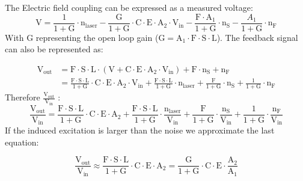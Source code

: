 The  Electric field coupling can be expressed as a measured voltage:
$$\mathrm{V} = \frac{1}{1 + \mathrm{G}} \cdot \mathrm{n}_\mathrm{laser} - \frac{\mathrm{G}}{1 + \mathrm{G}} \cdot \mathrm{C}  \cdot \mathrm{E} \cdot \mathrm{A}_{2} \cdot \mathrm{V}_\mathrm{in} - \frac{\mathrm{F} \cdot \mathrm{A}_1}{1 + \mathrm{G}} \cdot \mathrm{n}_\mathrm{S} - \frac{A_1}{1 + \mathrm{G}} \cdot \mathrm{n}_\mathrm{F}$$
With G representing the open loop gain ($\mathrm{G} = \mathrm{A}_1 \cdot \mathrm{F} \cdot \mathrm{S} \cdot \mathrm{L}$). The feedback signal can also be represented as:

	\begin{align*} \mathrm{V}_\mathrm{out} & = \mathrm{F} \cdot \mathrm{S} \cdot \mathrm{L} \cdot (\mathrm{V} + \mathrm{C} \cdot \mathrm{E} \cdot \mathrm{A}_{2} \cdot \mathrm{V}_\mathrm{in}) + \mathrm{F} \cdot \mathrm{n}_\mathrm{S} + \mathrm{n}_\mathrm{F} \\ & = \frac{\mathrm{F} \cdot \mathrm{S} \cdot \mathrm{L}}{ 1 + \mathrm{G}} \cdot \mathrm{C} \cdot \mathrm{E} \cdot \mathrm{A}_{2} \cdot \mathrm{V}_\mathrm{in} + \frac{\mathrm{F} \cdot \mathrm{S} \cdot \mathrm{L}}{ 1 + \mathrm{G}} \cdot \mathrm{n}_\mathrm{laser} + \frac{\mathrm{F} }{ 1 + \mathrm{G}}\cdot \mathrm{n}_\mathrm{S} +  \frac{1}{ 1 + \mathrm{G}} \cdot \mathrm{n}_\mathrm{F} \end{align*}
Therefore $\frac{\mathrm{V}_\mathrm{out}}{\mathrm{V}_\mathrm{in}}$ : 
$$ \frac{\mathrm{V}_\mathrm{out}}{\mathrm{V}_\mathrm{in}} = \frac{\mathrm{F} \cdot \mathrm{S} \cdot \mathrm{L}}{1 + \mathrm{G}} \cdot \mathrm{C} \cdot \mathrm{E} \cdot \mathrm{A}_{2}  + \frac{\mathrm{F} \cdot \mathrm{S} \cdot \mathrm{L}}{ 1 + \mathrm{G}} \cdot \frac{\mathrm{n}_\mathrm{laser}}{\mathrm{V}_\mathrm{in}}+ \frac{\mathrm{F} }{ 1 + \mathrm{G}} \cdot \frac{\mathrm{n}_\mathrm{S}}{\mathrm{V}_\mathrm{in}} +  \frac{1}{ 1 + \mathrm{G}} \cdot \frac{\mathrm{n}_\mathrm{F}}{\mathrm{V}_\mathrm{in}}$$
If the induced excitation is larger than the noise  we approximate the last equation:

$$ \frac{\mathrm{V}_\mathrm{out}}{\mathrm{V_{in}}} \approx \frac{\mathrm{F} \cdot \mathrm{S} \cdot \mathrm{L}}{1 + \mathrm{G}} \cdot \mathrm{C} \cdot \mathrm{E} \cdot \mathrm{A}_{2} = \frac{\mathrm{G}}{1 + \mathrm{G}} \cdot \mathrm{C} \cdot \mathrm{E} \cdot \frac{\mathrm{A}_{2}}{\mathrm{A}_{1}} $$

